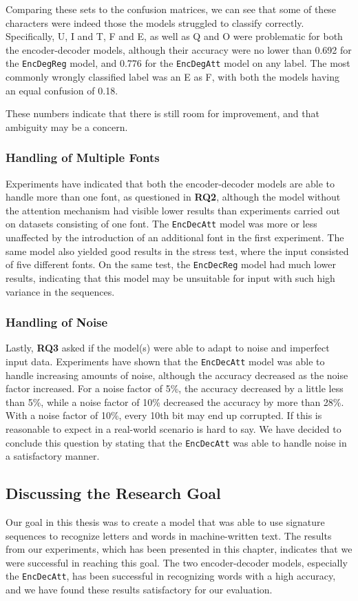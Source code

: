 Comparing these sets to the confusion matrices, we can see that some of these characters were indeed those the models struggled to classify correctly. Specifically, U, I and T, F and E, as well as Q and O were problematic for both the encoder-decoder models, although their accuracy were no lower than 0.692 for the {\tt EncDegReg} model, and 0.776 for the {\tt EncDegAtt} model on any label. The most commonly wrongly classified label was an E as F, with both the models having an equal confusion of 0.18. 

These numbers indicate that there is still room for improvement, and that ambiguity may be a concern.

\subsubsection{Handling of Multiple Fonts}
Experiments have indicated that both the encoder-decoder models are able to handle more than one font, as questioned in \textbf{RQ2}, although the model without the attention mechanism had visible lower results than experiments carried out on datasets consisting of one font. The {\tt EncDecAtt} model was more or less unaffected by the introduction of an additional font in the first experiment. The same model also yielded good results in the stress test, where the input consisted of five different fonts. On the same test, the {\tt EncDecReg} model had much lower results, indicating that this model may be unsuitable for input with such high variance in the sequences.

\subsubsection{Handling of Noise}
Lastly, \textbf{RQ3} asked if the model(s) were able to adapt to noise and imperfect input data. Experiments have shown that the {\tt EncDecAtt} model was able to handle increasing amounts of noise, although the accuracy decreased as the noise factor increased. For a noise factor of 5\%, the accuracy decreased by a little less than 5\%, while a noise factor of 10\% decreased the accuracy by more than 28\%. With a noise factor of 10\%, every 10th bit may end up corrupted. If this is reasonable to expect in a real-world scenario is hard to say. We have decided to conclude this question by stating that the {\tt EncDecAtt} was able to handle noise in a satisfactory manner.

\subsection{Discussing the Research Goal}
Our goal in this thesis was to create a model that was able to use signature sequences to recognize letters and words in machine-written text. The results from our experiments, which has been presented in this chapter, indicates that we were successful in reaching this goal. The two encoder-decoder models, especially the {\tt EncDecAtt}, has been successful in recognizing words with a high accuracy, and we have found these results satisfactory for our evaluation.

